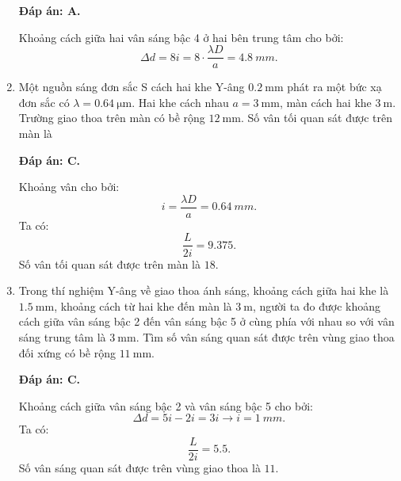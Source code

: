 \begin{enumerate}[label=\bfseries Câu \arabic*:]
	\loigiai
	{		\textbf{Đáp án: A.}
		
Khoảng cách giữa hai vân sáng bậc 4 ở hai bên trung tâm cho bởi:
$$
	\Delta d = 8i = 8 \cdot \dfrac{\lambda D}{a} = \SI{4,8}{mm}.
$$
		
	}
	
	\item {} 
	
	\cauhoi
	{Một nguồn sáng đơn sắc S cách hai khe Y-âng $\SI{0.2}{\milli \meter}$ phát ra một bức xạ đơn sắc có $\lambda=\SI{0.64}{\micro \meter}$. Hai khe cách nhau $a=\SI{3}{\milli \meter}$, màn cách hai khe $\SI{3}{\meter}$. Trường giao thoa trên màn có bề rộng $\SI{12}{\milli \meter}$. Số vân tối quan sát được trên màn là
	}
	
	\loigiai
	{		\textbf{Đáp án: C.}
		
Khoảng vân cho bởi:
$$
	i = \dfrac{\lambda D}{a} = \SI{0,64}{mm}.
$$
Ta có:
$$
	\dfrac{L}{2i} = \num{9,375}.
$$
Số vân tối quan sát được trên màn là $ \num{18} $.
	}
	
\item {} 
	
	\cauhoi
	{Trong thí nghiệm Y-âng về giao thoa ánh sáng, khoảng cách giữa hai khe là $\SI{1.5}{\milli \meter}$, khoảng cách từ hai khe đến màn là $\SI{3}{\meter}$, người ta đo được khoảng cách giữa vân sáng bậc 2 đến vân sáng bậc 5 ở cùng phía với nhau so với vân sáng trung tâm là $\SI{3}{\milli \meter}$. Tìm số vân sáng quan sát được trên vùng giao thoa đối xứng có bề rộng $\SI{11}{\milli \meter}$.
	}
	
	\loigiai
	{		\textbf{Đáp án: C.}
		
Khoảng cách giữa vân sáng bậc 2 và vân sáng bậc 5 cho bởi:
$$
	\Delta d = 5i - 2i = 3i \rightarrow i = \SI{1}{mm}.
$$
Ta có:
$$
	\dfrac{L}{2i} = \num{5,5}.
$$
Số vân sáng quan sát được trên vùng giao thoa là $ \num{11} $.
		
}
\end{enumerate}
